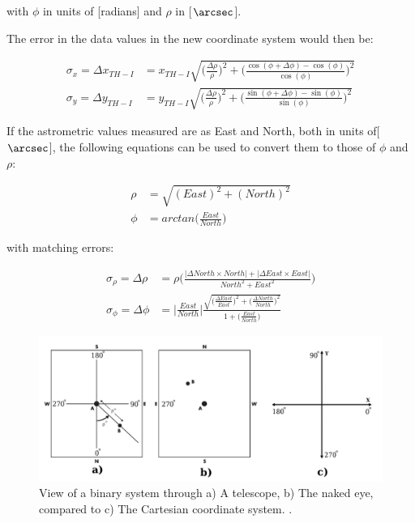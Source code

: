 \documentclass[12pt,preprint]{aastex}
\begin{document}
with $\phi$ in units of [radians] and $\rho$ in [$\arcsec$].

The error in the data values in the new coordinate system would then be:

\begin{subequations}
\begin{align}\label{eq:28-3a}
\sigma_{x}=\Delta x_{TH-I}& = x_{TH-I} \sqrt{\bigg(\frac{\Delta\rho}{\rho}\bigg)^2 +\bigg(\frac{\cos(\phi+\Delta\phi)-\cos(\phi)}{\cos(\phi)}\bigg)^2} \\
\label{eq:28-3b}
\sigma_{y}=\Delta y_{TH-I}& = y_{TH-I} \sqrt{\bigg(\frac{\Delta\rho}{\rho}\bigg)^2 +\bigg(\frac{\sin(\phi+\Delta\phi)-\sin(\phi)}{\sin(\phi)}\bigg)^2} 
\end{align}
\end{subequations}

If the astrometric values measured are as East and North, both in units of[$\arcsec$], the following equations can be used to convert them to those of $\phi$ and $\rho$: 

\begin{subequations}
\begin{align}\label{eq:22-a}
\rho& = \sqrt{(East)^2+(North)^2} \\
\label{eq:29-b}
\phi& = arctan\bigg(\frac{East}{North} \bigg) 
\end{align}
\end{subequations}

with matching errors:

\begin{subequations}
\begin{align}\label{eq:30-a}
\sigma_{\rho}=\Delta \rho& = \rho \bigg(\frac{|\Delta North \times North| + |\Delta East \times East|}{North^2 + East^2}\bigg)\\
\label{eq:30-b}
\sigma_{\phi}=\Delta \phi& = \Bigg|\frac{East}{North}\Bigg|\frac{\sqrt{\big( \frac{\Delta East}{East} \big)^2+\big(\frac{\Delta North}{North} \big)^2}}{1+\big(\frac{East}{North} \big)   } 
\end{align}
\end{subequations}

\begin{figure}[h]
\begin{center}
\includegraphics[scale=0.9]{Figures/Argyle-oribit-plots1-cropped-AND-cartesianCoordsPlot.jpg}
\caption[View of a Binary System]{ View of a binary system through a) A telescope, b) The naked eye, compared to c) The Cartesian coordinate system. \citet{Argyle}. }
\label{fig:4}
\end{center}
\end{figure}
\end{document}
